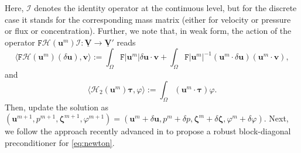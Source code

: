 \documentclass[11pt, reqno, a4paper, twoside]{article}
\newcommand{\bu}{\boldsymbol{u}}
\newcommand{\bv}{\boldsymbol{v}}
\newcommand\bzeta{\boldsymbol{\zeta}}
\newcommand\btau{\boldsymbol{\tau}}
\newcommand{\rF}{\mathtt{F}}
\newcommand{\bV}{\mathbf{V}}
\numberwithin{equation}{section}
\numberwithin{remark}{section}
\numberwithin{figure}{section}
\numberwithin{table}{section}
\newcommand{\rd}[1]{\textcolor{BrickRed}{#1}}
\begin{document}
Here, $\mathcal{I}$ denotes the identity operator  at the continuous level, but for the discrete case it stands for the corresponding mass matrix (either for velocity or pressure or flux or concentration). Further, we note that, in weak form, the action of the operator $\rF\mathcal{H}({\bu}^m)\mathcal{I}:\underline{\bV}\to \underline{\bV}'$ reads
\[ \langle \rF \mathcal{H}({\bu}^m)(\delta \bu), \bv \rangle := \int_\Omega \rF |\bu^m|\delta\bu \cdot \bv + \int_\Omega \rF |\bu^m|^{-1}(\bu^m \cdot \delta\bu) (\bu^m \cdot \bv), \]
and \[\langle\mathcal{H}_2(\bu^m)\btau,\varphi\rangle:=\int_{\Omega}(\bu^m\cdot\btau)\varphi.\]
Then, update the solution as \((\bu^{m+1},p^{m+1},\bzeta^{m+1},\varphi^{m+1}) = (\bu^m + \delta \bu, p^m + \delta p,\bzeta^m+\delta\bzeta,\varphi^m+\delta\varphi)\). 
\noindent
Next, we follow the approach recently advanced in \cite[Section~3]{cai2026parameter} to propose a robust block-diagonal preconditioner for \eqref{eq:newton}. 
\end{document}
